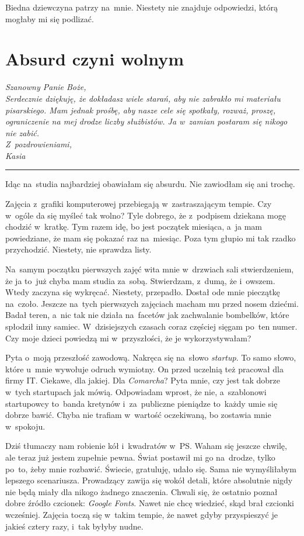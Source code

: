 \documentclass[9pt, a5paper]{memoir}
\begin{document}
Biedna dziewczyna patrzy na~mnie. Niestety nie znajduje odpowiedzi, którą mogłaby mi się podlizać.

\newpage
\section{Absurd czyni wolnym}
{
\itshape
Szanowny Panie Boże,\\
Serdecznie dziękuję, że dokładasz wiele starań, aby nie zabrakło mi materiału pisarskiego. Mam jednak prośbę, aby nasze cele się spotkały, rozważ, proszę, ograniczenie na mej drodze liczby służbistów. Ja w~zamian postaram się nikogo nie zabić.\\
Z~pozdrowieniami,\\
Kasia
}

\fancybreak{* \quad * \quad *}

Idąc na~studia najbardziej obawiałam się absurdu. Nie zawiodłam się ani trochę.

Zajęcia z~grafiki komputerowej przebiegają w~zastraszającym tempie. Czy w~ogóle da się myśleć tak wolno? Tyle dobrego, że z~podpisem dziekana mogę chodzić w~kratkę. Tym razem idę, bo jest początek miesiąca, a~ja mam powiedziane, że mam się pokazać raz na~miesiąc. Poza tym głupio mi tak rzadko przychodzić. Niestety, nie sprawdza listy.

Na~samym początku pierwszych zajęć wita mnie w~drzwiach sali stwierdzeniem, że ja to~już chyba mam studia za~sobą. Stwierdzam, z~dumą, że i~owszem. Wtedy zaczyna się wykręcać. Niestety, przepadło. Dostał ode mnie pieczątkę na~czoło. Jeszcze na~tych pierwszych zajęciach macham mu przed nosem dziećmi. Badał teren, a~nic tak nie działa na~facetów jak zachwalanie bombelków, które spłodził inny samiec. W~dzisiejszych czasach coraz częściej sięgam po~ten numer. Czy moje dzieci powiedzą mi w~przyszłości, że je wykorzystywałam?

Pyta o~moją przeszłość zawodową. Nakręca się na~słowo \textit{startup}. To samo słowo, które u~mnie wywołuje odruch wymiotny. On przed uczelnią też pracował dla firmy IT. Ciekawe, dla jakiej. Dla \textit{Comarcha}? Pyta mnie, czy jest tak dobrze w~tych startupach jak mówią. Odpowiadam wprost, że nie, a~szablonowi startupowcy to~banda kretynów i~za~publiczne pieniądze to~każdy umie się dobrze bawić. Chyba nie trafiam w~wartość oczekiwaną, bo zostawia mnie w~spokoju.

Dziś tłumaczy nam robienie kół i~kwadratów w~PS. Waham się jeszcze chwilę, ale teraz już jestem zupełnie pewna. Świat postawił mi go na~drodze, tylko po~to, żeby mnie rozbawić. Świecie, gratuluję, udało się. Sama nie wymyśliłabym lepszego scenariusza. Prowadzący zawija się wokół detali, które absolutnie nigdy nie będą miały dla nikogo żadnego znaczenia. Chwali się, że ostatnio poznał dobre źródło czcionek: \textit{Google Fonts}. Nawet nie chcę wiedzieć, skąd brał czcionki wcześniej. Zajęcia toczą się w~takim tempie, że nawet gdyby przyspieszyć je jakieś cztery razy, i~tak byłyby nudne.
\end{document}
